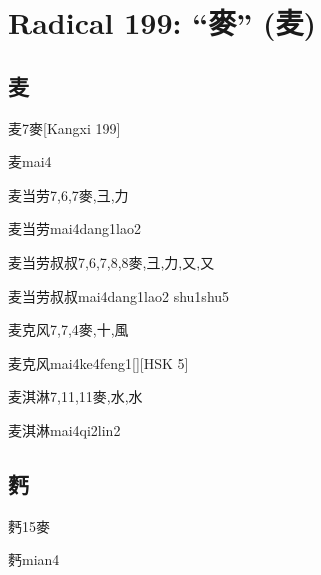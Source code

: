 \section*{Radical 199: ``⿆'' (麦)}

\subsection*{麦}

\begin{Entry}{麦}{7}{⿆}[Kangxi 199]
  \begin{Phonetics}{麦}{mai4}
  \end{Phonetics}
\end{Entry}

\begin{Entry}{麦当劳}{7,6,7}{⿆,⼹,⼒}
  \begin{Phonetics}{麦当劳}{mai4dang1lao2}
  \end{Phonetics}
\end{Entry}

\begin{Entry}{麦当劳叔叔}{7,6,7,8,8}{⿆,⼹,⼒,⼜,⼜}
  \begin{Phonetics}{麦当劳叔叔}{mai4dang1lao2 shu1shu5}
  \end{Phonetics}
\end{Entry}

\begin{Entry}{麦克风}{7,7,4}{⿆,⼗,⾵}
  \begin{Phonetics}{麦克风}{mai4ke4feng1}[][HSK 5]
  \end{Phonetics}
\end{Entry}

\begin{Entry}{麦淇淋}{7,11,11}{⿆,⽔,⽔}
  \begin{Phonetics}{麦淇淋}{mai4qi2lin2}
  \end{Phonetics}
\end{Entry}

\subsection*{麫}

\begin{Entry}{麫}{15}{⿆}
  \begin{Phonetics}{麫}{mian4}
  \end{Phonetics}
\end{Entry}


